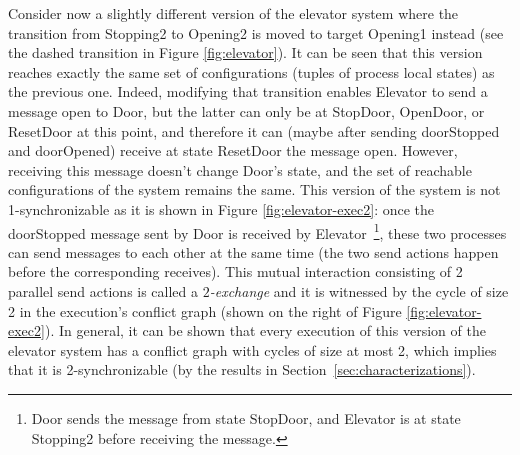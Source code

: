 Consider now a slightly different version of the elevator system where the transition from {\sf Stopping2} to {\sf Opening2} is moved to target {\sf Opening1} instead (see the dashed transition in Figure \ref{fig:elevator}). It can be seen that this version reaches exactly the same set of configurations (tuples of process local states) as the previous one. Indeed, modifying that transition enables {\sf Elevator} to send a message {\sf open} to {\sf Door}, but the latter can only be at {\sf StopDoor}, {\sf OpenDoor}, or {\sf ResetDoor} at this point, and therefore it can (maybe after sending {\sf doorStopped} and {\sf doorOpened}) receive at state {\sf ResetDoor} the message {\sf open}. However, receiving this message doesn't change {\sf Door}'s state, and the set of reachable configurations of the system remains the same. This version of the system is not 1-synchronizable as it is shown in Figure \ref{fig:elevator-exec2}: once the {\sf doorStopped} message sent by {\sf Door} is received by {\sf Elevator}~\footnote{{\sf Door} sends the message from state {\sf StopDoor}, and {\sf Elevator} is at state {\sf Stopping2} before receiving the message.}, these two processes can send messages to each other at the same time (the two send actions happen before the corresponding receives). This mutual interaction consisting of 2 parallel send actions is called a \emph{$2$-exchange} and it is witnessed by the cycle of size 2 in the execution's conflict graph (shown on the right of Figure \ref{fig:elevator-exec2}).
In general, it can be shown that every execution of this version of the elevator system has a conflict graph with cycles of size at most 2, which implies that it is 2-synchronizable (by the results in Section~\ref{sec:characterizations}).

